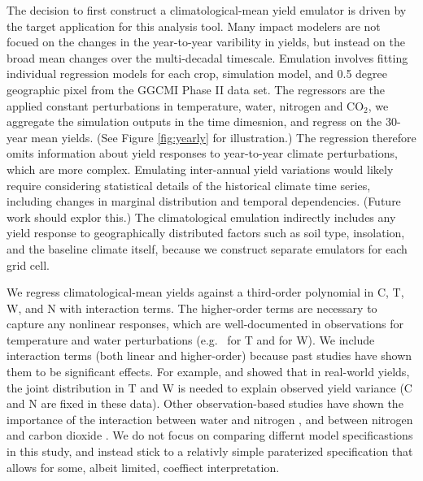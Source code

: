 \documentclass[preprint, 5p, times, twocolumn]{elsarticle}
\begin{document}
The decision to first construct a climatological-mean yield emulator is driven by the target application for this analysis tool. Many impact modelers are not focued on the changes in the year-to-year varibility in yields, but instead on the broad mean changes over the multi-decadal timescale. Emulation involves fitting individual regression models for each crop, simulation model, and 0.5 degree geographic pixel from the GGCMI Phase II data set. The regressors are the applied constant perturbations in temperature, water, nitrogen and CO$_2$, we aggregate the simulation outputs in the time dimesnion, and regress on the 30-year mean yields. (See Figure \ref{fig:yearly} for illustration.) The regression therefore omits information about yield responses to year-to-year climate perturbations, which are more complex. Emulating inter-annual yield variations would likely require considering statistical details of the historical climate time series, including changes in marginal distribution and temporal dependencies. (Future work should explor this.) The climatological emulation indirectly includes any yield response to geographically distributed factors such as soil type, insolation, and the baseline climate itself, because we construct separate emulators for each grid cell. 


We regress climatological-mean yields against a third-order polynomial in C, T, W, and N with interaction terms. The higher-order terms are necessary to capture any nonlinear responses, which are well-documented in observations for temperature and water perturbations (e.g.\ \citet{Schlenker2009} for T and \citet{He2016} for W). We include interaction terms (both linear and higher-order)  because past studies have shown them to be significant effects. For example, \citet{Lobell2007} and \citet{Tebaldi2008} showed that in real-world yields, the joint distribution in T and W is needed to explain observed yield variance (C and N are fixed in these data). Other observation-based studies have shown the importance of the interaction between water and nitrogen \citep[e.g.\ ][]{AULAKH2005}, and between nitrogen and carbon dioxide \citep{Mitsuru92, Nakamura97}. We do not focus on comparing differnt model specificastions in this study, and instead stick to a relativly simple paraterized specification that allows for some, albeit limited, coeffiect interpretation.
\end{document}

